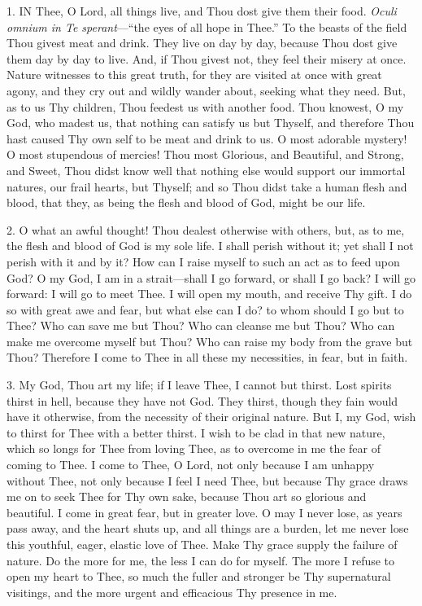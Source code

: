 1. IN
Thee, O Lord, all things live, and Thou dost give them their food. \emph{Oculi
omnium in Te sperant}—``the eyes of all hope in Thee.'' To the beasts
of the field Thou givest meat and drink. They live on day by day,
because Thou dost give them day by day to live. And, if Thou givest not,
they feel their misery at once. Nature witnesses to this great truth,
for they are visited at once with great agony, and they cry out and
wildly wander about, seeking what they need. But, as to us Thy children,
Thou feedest us with another food. Thou knowest, O my God, who madest
us, that nothing can satisfy us but Thyself, and therefore Thou hast
caused Thy own self to be meat and drink to us. O most adorable mystery!
O most stupendous of mercies! Thou most Glorious, and Beautiful,
and Strong, and Sweet, Thou didst know well that nothing else would
support our immortal natures, our frail hearts, but Thyself; and so Thou
didst take a human flesh and blood, that they, as being the flesh and
blood of God, might be our life.

2. O what an awful thought! Thou
dealest otherwise with others, but, as to me, the flesh and blood of God
is my sole life. I shall perish without it; yet shall I not perish with
it and by it? How can I raise myself to such an act as to feed upon God?
O my God, I am in a strait—shall I go forward, or shall I go back? I
will go forward: I will go to meet Thee. I will open my mouth, and
receive Thy gift. I do so with great awe and fear, but what else can I
do? to whom should I go but to Thee? Who can save me but Thou? Who can
cleanse me but Thou? Who can make me overcome myself but Thou? Who can
raise my body from the grave but Thou? Therefore I come to Thee in all
these my necessities, in fear, but in faith.

3. My God, Thou art my life; if
I leave Thee, I cannot but thirst. Lost spirits thirst in hell, because
they have not God. They thirst, though they fain would have it
otherwise, from the necessity of their original nature. But I, my God,
wish to thirst for Thee with a better thirst. I wish to be clad in that
new nature, which so longs for Thee from loving Thee, as to overcome in
me the fear of coming to Thee. I come to Thee, O Lord, not only because
I am unhappy without Thee, not only because I feel I need Thee,
but because Thy grace draws me on to seek Thee for Thy own sake, because
Thou art so glorious and beautiful. I come in great fear, but in greater
love. O may I never lose, as years pass away, and the heart shuts up,
and all things are a burden, let me never lose this youthful, eager,
elastic love of Thee. Make Thy grace supply the failure of nature. Do
the more for me, the less I can do for myself. The more I refuse to open
my heart to Thee, so much the fuller and stronger be Thy supernatural
visitings, and the more urgent and efficacious Thy presence in me.

